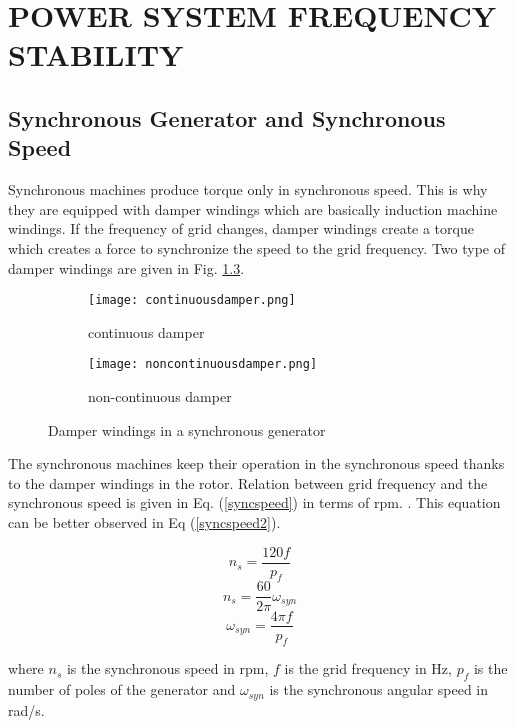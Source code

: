\chapter{POWER SYSTEM FREQUENCY STABILITY}
\label{chp:2}
\section{Synchronous Generator and Synchronous Speed}

Synchronous machines produce torque only in synchronous speed. This is why they are equipped with damper windings which are basically induction machine windings. If the frequency of  grid changes, damper windings create a torque which creates a force to synchronize the speed to the grid frequency. Two type of damper windings are given in Fig. \ref{damperwindings}.

\begin{figure}[h!]
	\centering
	\begin{subfigure}{.5\textwidth}
		\centering
		\texttt{[image: continuousdamper.png]}
		\caption{continuous damper}
		\label{continuousdamper}
	\end{subfigure}%
	\begin{subfigure}{.5\textwidth}
		\centering
		\texttt{[image: noncontinuousdamper.png]}
		\caption{non-continuous damper}
		\label{noncontinuousdamper}
	\end{subfigure}
	\caption{Damper windings in a synchronous generator \cite{Kundur}}
	\label{damperwindings}
\end{figure}

The synchronous machines keep their operation in the synchronous speed thanks to the damper windings in the rotor. Relation between grid frequency and the synchronous speed is given in Eq. (\ref{syncspeed}) in terms of rpm. \cite{Kundur}. This equation can be better observed in Eq (\ref{syncspeed2}).

\begin{equation}
 n_{s}=\frac{120f}{p_{f}}
 \label{syncspeed}
\end{equation}
\begin{equation}
 n_{s}=\frac{60}{2\pi}\omega_{syn}
\end{equation}
\begin{equation}
\omega_{syn}=\frac{4\pi f}{p_{f}}
\label{syncspeed2}
\end{equation}

where $n_{s}$ is the synchronous speed in rpm, $f$ is the grid frequency in Hz, $p_{f}$ is the number of poles of the generator and $\omega_{syn}$ is the synchronous angular speed in rad/s.

